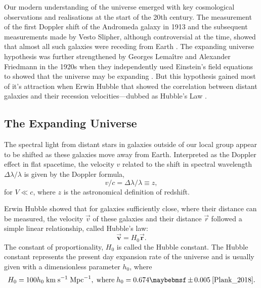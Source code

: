 Our modern understanding of the universe emerged with key cosmological observations and realisations at the start of the 20th century. The measurement of the first Doppler shift of the Andromeda galaxy in 1913 and the subsequent measurements made by Vesto Slipher, although controversial at the time, showed that almost all such galaxies were receding from Earth \cite{Slipler}. The expanding universe hypothesis was further strengthened by Georges Lemaître and Alexander Friedmann in the 1920s when they independently used Einstein's field equations to showed that the universe may be expanding \cite{Friedman}. But this hypothesis gained most of it's attraction when Erwin Hubble that showed the correlation between distant galaxies and their recession velocities---dubbed as Hubble's Law \cite{Hubble}.


\subsection{The Expanding Universe}

The spectral light from distant stars in galaxies outside of our local group appear to be shifted as these galaxies move away from Earth. Interpreted as the Doppler effect in flat spacetime, the velocity $v$ related to the shift in  spectral wavelength $\Delta \lambda/\lambda$ is given by the Doppler formula,
%
\begin{equation}
  v/c = \Delta \lambda/\lambda \equiv z,
\end{equation}
%
for $V \ll c$, where $z$ is the astronomical definition of redshift. 

Erwin Hubble showed that for galaxies sufficiently close, where their distance can be measured, the velocity $\vec{v}$ of these galaxies and their distance $\vec{r}$ followed a simple linear relationship, called Hubble's law:
%
\begin{equation}
  \boldsymbol{\vec{v}} = H_0\boldsymbol{\vec{r}}.
\end{equation}
%
The constant of proportionality, $H_0$ is called the Hubble constant. The Hubble constant represents the present day expansion rate of the universe and is usually given with a dimensionless parameter $h_0$, where
%
\begin{equation}\label{eq:hubble_constant}
  H_0 = 100h_0 \; \MathText{km} \; \MathText{s}^{-1} \; \MathText{Mpc}^{-1}, \; \MathText{where} \; h_0 = 0.674 \pm 0.005 \: \cite{Plank_2018}.
\end{equation}
%

